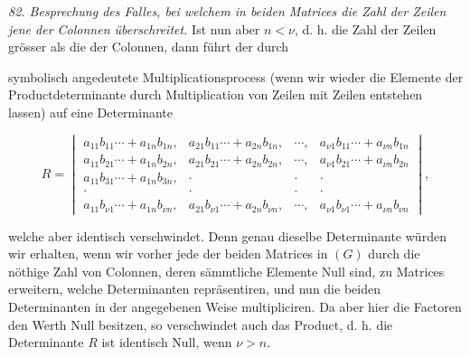 \textit{82. Besprechung des Falles, bei welchem in beiden Matrices die Zahl der Zeilen jene der Colonnen überschreitet.} Ist nun aber $n<\nu$, d. h. die Zahl der Zeilen grösser als die der Colonnen, dann führt der durch




symbolisch angedeutete Multiplicationsprocess (wenn wir wieder die Elemente der Productdeterminante durch Multiplication von Zeilen mit Zeilen entstehen lassen) auf eine Determinante

\[
R=
\begin{vmatrix}
a_{11}b_{11}\cdots+a_{1n}b_{1n}, & a_{21}b_{11}\cdots+a_{2n}b_{1n}, & \cdots, & a_{\nu 1}b_{11}\cdots+a_{\nu n}b_{1n}\\
a_{11}b_{21}\cdots+a_{1n}b_{2n}, & a_{21}b_{21}\cdots+a_{2n}b_{2n}, & \cdots, & a_{\nu 1}b_{21}\cdots+a_{\nu n}b_{2n}\\
a_{11}b_{31}\cdots+a_{1n}b_{3n}, & \cdot & \cdot & \cdot\\
\cdot & \cdot & \cdot & \cdot\\
a_{11}b_{\nu 1}\cdots+a_{1n}b_{\nu n}, & a_{21}b_{\nu 1}\cdots+a_{2n}b_{\nu n}, & \cdots, & a_{\nu 1}b_{\nu 1}\cdots+a_{\nu n}b_{\nu n}
\end{vmatrix},
\]

welche aber identisch verschwindet. Denn genau dieselbe Determinante würden wir erhalten, wenn wir vorher jede der beiden Matrices in $(G)$ durch die nöthige Zahl von Colonnen, deren sämmtliche Elemente Null sind, zu Matrices erweitern, welche Determinanten repräsentiren, und nun die beiden Determinanten in der angegebenen Weise multipliciren. Da aber hier die Factoren den Werth Null besitzen, so verschwindet auch das Product, d. h. die Determinante $R$ ist identisch Null, wenn $\nu>n$.

